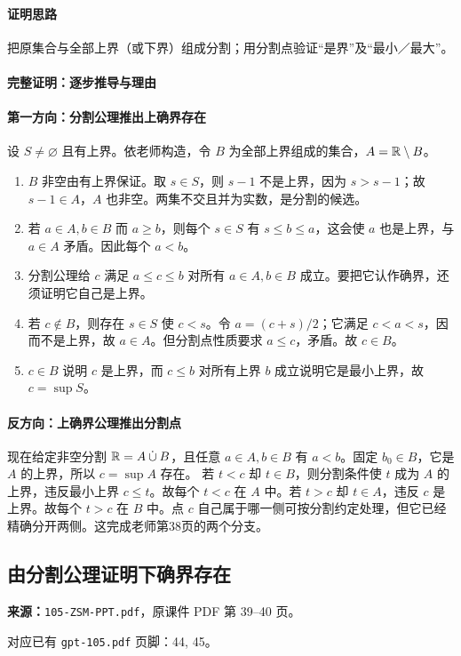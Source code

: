 \paragraph{证明思路}把原集合与全部上界（或下界）组成分割；用分割点验证“是界”及“最小／最大”。
\paragraph{完整证明：逐步推导与理由}

\paragraph{第一方向：分割公理推出上确界存在}
设 $S\ne\varnothing$ 且有上界。依老师构造，令 $B$ 为全部上界组成的集合，$A=\mathbb{R}\setminus B$。
\begin{enumerate}
\item $B$ 非空由有上界保证。取 $s\in S$，则 $s-1$ 不是上界，因为 $s>s-1$；故 $s-1\in A$，$A$ 也非空。两集不交且并为实数，是分割的候选。
\item 若 $a\in A,b\in B$ 而 $a\ge b$，则每个 $s\in S$ 有 $s\le b\le a$，这会使 $a$ 也是上界，与 $a\in A$ 矛盾。因此每个 $a<b$。
\item 分割公理给 $c$ 满足 $a\le c\le b$ 对所有 $a\in A,b\in B$ 成立。要把它认作确界，还须证明它自己是上界。
\item 若 $c\notin B$，则存在 $s\in S$ 使 $c<s$。令 $a=(c+s)/2$；它满足 $c<a<s$，因而不是上界，故 $a\in A$。但分割点性质要求 $a\le c$，矛盾。故 $c\in B$。
\item $c\in B$ 说明 $c$ 是上界，而 $c\le b$ 对所有上界 $b$ 成立说明它是最小上界，故 $c=\sup S$。
\end{enumerate}
\paragraph{反方向：上确界公理推出分割点}
现在给定非空分割 $\mathbb{R}=A\mathbin{\dot\cup}B$，且任意 $a\in A,b\in B$ 有 $a<b$。固定 $b_0\in B$，它是 $A$ 的上界，所以 $c=\sup A$ 存在。
若 $t<c$ 却 $t\in B$，则分割条件使 $t$ 成为 $A$ 的上界，违反最小上界 $c\le t$。故每个 $t<c$ 在 $A$ 中。若 $t>c$ 却 $t\in A$，违反 $c$ 是上界。故每个 $t>c$ 在 $B$ 中。点 $c$ 自己属于哪一侧可按分割约定处理，但它已经精确分开两侧。这完成老师第38页的两个分支。

\clearpage\subsection{由分割公理证明下确界存在}
\textbf{来源：}\texttt{105-ZSM-PPT.pdf}，原课件 PDF 第 39--40 页。\par
对应已有 \texttt{gpt-105.pdf} 页脚：44, 45。\par
